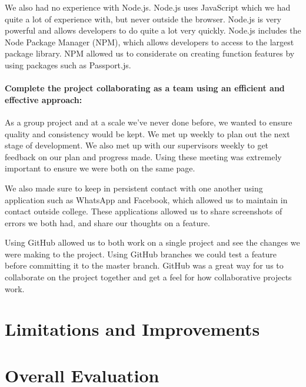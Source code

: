We also had no experience with Node.js. Node.js uses JavaScript which we had quite a lot of experience with, but never outside the browser. Node.js is very powerful and allows developers to do quite a lot very quickly. Node.js includes the Node Package Manager (NPM), which allows developers to access to the largest package library. NPM allowed us to considerate on creating function features by using packages such as Passport.js.

\paragraph{Complete  the  project  collaborating  as  a  team  using  an  efficient  and effective approach:}
As a group project and at a scale we've never done before, we wanted to ensure quality  and consistency would be kept. We met up weekly to plan out the next stage of development. We also met up with our supervisors weekly to get feedback on our plan and progress made. Using these meeting was extremely important to ensure we were both on the same page.

We also made sure to keep in persistent contact with one another using application such as WhatsApp and Facebook, which allowed us to maintain in contact outside college. These applications allowed us to share screenshots of errors we both had, and share our thoughts on a feature.

Using GitHub allowed us to both work on a single project and see the changes we were making to the project. Using GitHub branches we could test a feature before committing it to the master branch. GitHub was a great way for us to collaborate on the project together and get a feel for how collaborative projects work.

\section{Limitations and Improvements}


\section{Overall Evaluation}